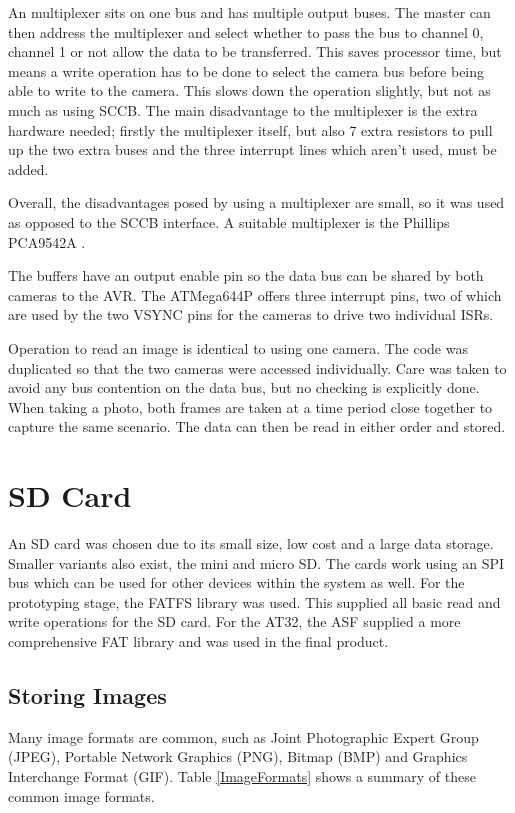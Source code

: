 An \itc multiplexer sits on one \itc bus and has multiple output buses. The master can then address the multiplexer and select whether to pass the bus to channel 0, channel 1 or not allow the data to be transferred. This saves processor time, but means a write operation has to be done to select the camera bus before being able to write to the camera. This slows down the operation slightly, but not as much as using SCCB. The main disadvantage to the \itc multiplexer is the extra hardware needed; firstly the multiplexer itself, but also 7 extra resistors to pull up the two extra buses and the three interrupt lines which aren't used, must be added. 

Overall, the disadvantages posed by using a multiplexer are small, so it was used as opposed to the SCCB interface. A suitable multiplexer is the Phillips PCA9542A \citep{I2C_Mux}.

The buffers have an output enable pin so the data bus can be shared by both cameras to the AVR. The ATMega644P offers three interrupt pins, two of which are used by the two VSYNC pins for the cameras to drive two individual ISRs. 

Operation to read an image is identical to using one camera. The code was duplicated so that the two cameras were accessed individually. Care was taken to avoid any bus contention on the data bus, but no checking is explicitly done. When taking a photo, both frames are taken at a time period close together to capture the same scenario. The data can then be read in either order and stored.

\section{SD Card} \label{sect:SDCard}

An SD card was chosen due to its small size, low cost and a large data storage. Smaller variants also exist, the mini and micro SD. The cards work using an SPI bus which can be used for other devices within the system as well. For the prototyping stage, the FATFS library \citep{FATFS} was used. This supplied all basic read and write operations for the SD card. For the AT32, the ASF supplied a more comprehensive FAT library and was used in the final product.

\subsection{Storing Images}

Many image formats are common, such as Joint Photographic Expert Group (JPEG), Portable Network Graphics (PNG), Bitmap (BMP) and Graphics Interchange Format (GIF). Table \ref{ImageFormats} shows a summary of these common image formats.


